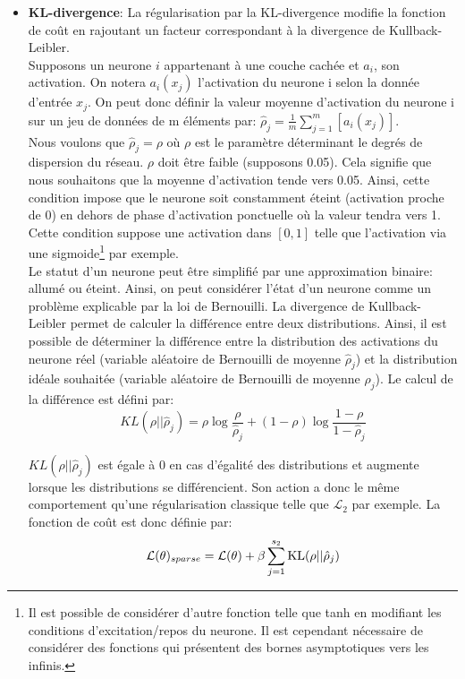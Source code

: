 \begin{itemize}
    \item \textbf{KL-divergence}: La régularisation par la KL-divergence modifie la fonction de coût en rajoutant un facteur correspondant à la divergence de Kullback-Leibler.\\

    Supposons un neurone $i$ appartenant à une couche cachée et $a_i$, son activation. On notera $a_i(x_j)$ l'activation du neurone i selon la donnée d'entrée $x_j$. On peut donc définir la valeur moyenne d'activation du neurone i sur un jeu de données de m éléments par: $\hat\rho_j = \frac{1}{m} \sum_{j=1}^m \left[ a_i(x_j) \right]$. \\

    Nous voulons que $\hat\rho_j=\rho$ où $\rho$ est le paramètre déterminant le degrés de dispersion du réseau. $\rho$ doit être faible (supposons 0.05). Cela signifie que nous souhaitons que la moyenne d'activation tende vers 0.05. Ainsi, cette condition impose que le neurone soit constamment éteint (activation proche de 0) en dehors de phase d'activation ponctuelle où la valeur tendra vers 1. Cette condition suppose une activation dans $[0,1]$ telle que l'activation via une sigmoide\footnote{Il est possible de considérer d'autre fonction telle que tanh en modifiant les conditions d'excitation/repos du neurone. Il est cependant nécessaire de considérer des fonctions qui présentent des bornes asymptotiques vers les infinis.} par exemple.\\

    Le statut d'un neurone peut être simplifié par une approximation binaire: allumé ou éteint. Ainsi, on peut considérer l'état d'un neurone comme un problème explicable par la loi de Bernouilli. La divergence de Kullback-Leibler permet de calculer la différence entre deux distributions. Ainsi, il est possible de déterminer la différence entre la distribution des activations du neurone réel (variable aléatoire de Bernouilli de moyenne $\hat\rho_j$) et la distribution idéale souhaitée (variable aléatoire de Bernouilli de moyenne $\rho_j$). Le calcul de la différence est défini par:
    $$KL(\rho || \hat\rho_j) = \rho \log \frac{\rho}{\hat\rho_j} + (1-\rho) \log \frac{1-\rho}{1-\hat\rho_j}$$

    $KL(\rho || \hat\rho_j)$ est égale à 0 en cas d'égalité des distributions et augmente lorsque les distributions se différencient. Son action a donc le même comportement qu'une régularisation classique telle que $\mathcal{L}_2$ par exemple. La fonction de coût est donc définie par:
    $$\mathcal{L}(\theta)_{sparse} = \mathcal{L}(\theta) + \beta \sum_{j=1}^{s_2} {\rm KL}(\rho || \hat\rho_j)$$


\end{itemize}
